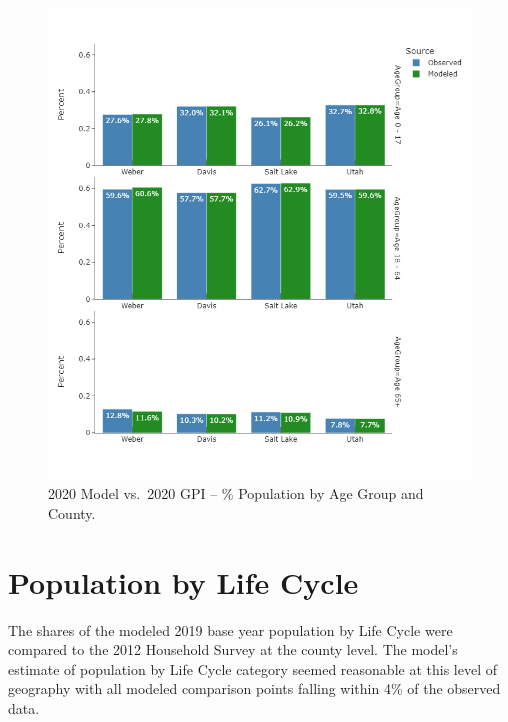\documentclass[
  letterpaper,
  DIV=11,
  numbers=noendperiod]{scrreprt}
\begin{document}
\begin{figure}[H]

{\centering \includegraphics{v9x/v900/validation/_pictures/1-plot3.png}

}

\caption{\label{fig-pdf-age-comp}2020 Model vs.~2020 GPI -- \%
Population by Age Group and County.}

\end{figure}

\hypertarget{population-by-life-cycle}{%
\section{Population by Life Cycle}\label{population-by-life-cycle}}

The shares of the modeled 2019 base year population by Life Cycle were
compared to the 2012 Household Survey at the county level. The model's
estimate of population by Life Cycle category seemed reasonable at this
level of geography with all modeled comparison points falling within 4\%
of the observed data.
\end{document}
